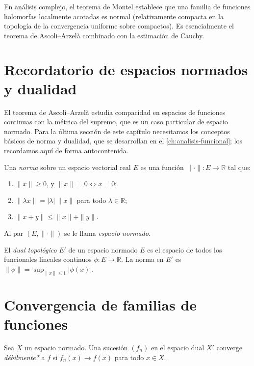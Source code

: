 \begin{example}
\label{ej:montel}
En análisis complejo, el teorema de Montel establece que una familia de funciones holomorfas localmente acotadas es normal (relativamente compacta en la topología de la convergencia uniforme sobre compactos). Es esencialmente el teorema de Ascoli--Arzelà combinado con la estimación de Cauchy.
\end{example}

\section{Recordatorio de espacios normados y dualidad}

El teorema de Ascoli--Arzelà estudia compacidad en espacios de funciones continuas con la métrica del supremo, que es un caso particular de espacio normado. Para la última sección de este capítulo necesitamos los conceptos básicos de norma y dualidad, que se desarrollan en el \cref{ch:analisis-funcional}; los recordamos aquí de forma autocontenida.

\begin{definition}
\label{def:norma-recordatorio}
Una \emph{norma} sobre un espacio vectorial real $E$ es una función $\|\cdot\|\colon E\to\mathbb{R}$ tal que:
\begin{enumerate}
  \item[(i)] $\|x\|\geq 0$, y $\|x\|=0\Leftrightarrow x=0$;
  \item[(ii)] $\|\lambda x\|=|\lambda|\,\|x\|$ para todo $\lambda\in\mathbb{R}$;
  \item[(iii)] $\|x+y\|\leq\|x\|+\|y\|$.
\end{enumerate}
Al par $(E,\|\cdot\|)$ se le llama \emph{espacio normado}.
\end{definition}

\begin{definition}
\label{def:dual-recordatorio}
El \emph{dual topológico} $E'$ de un espacio normado $E$ es el espacio de todos los funcionales lineales continuos $\phi\colon E\to\mathbb{R}$. La norma en $E'$ es $\|\phi\|=\sup_{\|x\|\leq 1}|\phi(x)|$.
\end{definition}

\section{Convergencia de familias de funciones}

\begin{definition}
\label{def:convergencia-debil}
Sea $X$ un espacio normado. Una sucesión $(f_n)$ en el espacio dual $X'$ converge \emph{débilmente*} a $f$ si $f_n(x)\to f(x)$ para todo $x\in X$.
\end{definition}

